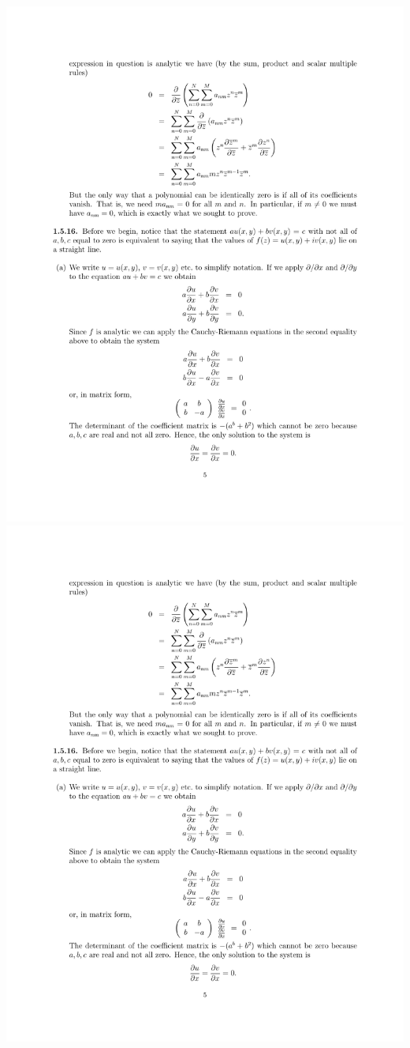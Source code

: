 \documentclass{homework}
\begin{document}
\begin{center}
  \includegraphics[page=1, width=\columnwidth]{figure/hw4_soln.pdf}
  \includegraphics[page=2, width=\columnwidth]{figure/hw4_soln.pdf}
\end{center}
\end{document}
